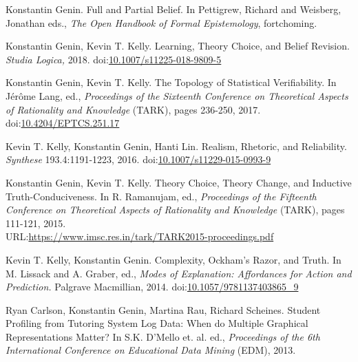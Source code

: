 \documentclass[12pt]{res} %
\begin{document}
\begin{resume}
\vspace{8pt} %
Konstantin Genin. Full and Partial Belief. In Pettigrew, Richard and Weisberg, Jonathan eds., {\em The Open Handbook of Formal Epistemology}, fortchoming.

Konstantin Genin, Kevin T. Kelly. {Learning, Theory Choice, and Belief Revision.} {\em Studia Logica,} 2018. doi:\href{https://doi.org/10.1007/s11225-018-9809-5}{10.1007/s11225-018-9809-5} 

Konstantin Genin, Kevin T. Kelly.{ The Topology of Statistical Verifiability.} In J\'{e}r\^{o}me Lang, ed., {\em Proceedings of the Sixteenth Conference on Theoretical Aspects of Rationality and Knowledge} (TARK), pages 236-250, 2017. doi:\href{https://doi.org/10.4204/EPTCS.251.17}{10.4204/EPTCS.251.17}


Kevin T. Kelly, Konstantin Genin, Hanti Lin. {Realism, Rhetoric, and Reliability.} {\em Synthese} 193.4:1191-1223, 2016. doi:\href{https://doi.org/10.1007/s11229-015-0993-9}{10.1007/s11229-015-0993-9}

Konstantin Genin, Kevin T. Kelly. {Theory Choice, Theory Change, and Inductive Truth-Conduciveness.} In R. Ramanujam, ed., {\em Proceedings of the Fifteenth Conference on Theoretical Aspects of Rationality and Knowledge} (TARK), pages 111-121, 2015.\\ URL:\href{https://www.imsc.res.in/tark/TARK2015-proceedings.pdf}{https://www.imsc.res.in/tark/TARK2015-proceedings.pdf}

Kevin T. Kelly, Konstantin Genin. {Complexity, Ockham's Razor, and Truth.} In M. Lissack and A. Graber, ed.,  {\em Modes of Explanation: Affordances for Action and Prediction.} Palgrave Macmillian, 2014. doi:\href{http://dx.doi.org/10.1057/9781137403865_9}{10.1057/9781137403865\_9}

Ryan Carlson, Konstantin Genin, Martina Rau, Richard Scheines. Student Profiling from Tutoring System Log Data: When do Multiple Graphical Representations Matter? In S.K. D'Mello et. al. ed., {\em Proceedings of the 6th International Conference on Educational Data Mining} (EDM), 2013.%



 

\end{resume}
\end{document}
